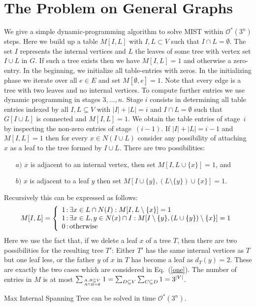 \documentclass{llncs}
\newcommand{\longversion}[1]{#1}
\newcommand{\mc}{\mathcal}
\newcommand{\Oh}{{\mc{O}}}
\begin{document}
\section{The Problem on General Graphs}
We give a simple dynamic-programming algorithm to solve MIST within $\Oh^*(3^n)$ steps. Here we build up a table $M[I,L]$ with $I,L \subset V$ such that $I \cap L= \emptyset$. The set $I$ represents the internal vertices and $L$ the leaves of some tree with vertex set $I \cup L$ in $G$. If such a tree exists then we have $M[I,L]=1$ and otherwise a zero-entry. \longversion{In the beginning, we initialize
all table-entries with zeros.} 
In the initializing phase we iterate over all $e \in E$ and set $M[\emptyset,e]=1$. 
Note that every edge is a tree with two leaves and no internal vertices. 
To compute further entries we use  dynamic programming in stages $3,\ldots,n$. 
Stage $i$ consists in determining all table entries indexed by all $I,L \subseteq V$ with $|I|+|L|=i$ and $I \cap L = \emptyset$ such that $G[I \cup L]$ is connected and $M[I,L]=1$. We obtain the table entries of stage~$i$ by inspecting the non-zero entries of stage~$(i-1)$. 
\longversion{If $|I|+|L|=i-1$ and $M[I,L]=1$ then for every $x \in N(I \cup L)$ consider any possibility of attaching $x$ as a leaf to the tree formed by $I \cup L$. There are two possibilities:
\begin{enumerate}
 \item[$a)$] $x$ is adjacent to an internal vertex, then set $M[I,L \cup \{x\}]=1$, and
 \item[$b)$] $x$ is adjacent to a leaf $y$ then set $M[I \cup \{y\},(L \setminus \{y\}) \cup \{x\}]=1$.
\end{enumerate}
}Recursively this can be expressed as follows:
\begin{equation}\label{one}
M[I,L]=\left\{
\begin{array}{l@{\,:\,}l}
1 & \exists x \in L \cap N(I): M[I,L \setminus  \{x\}]=1\\
1 & \exists x \in L, y \in N(x) \cap I: M[ I \setminus \{y\},(L \cup \{y\}) \setminus \{x\}]=1 \\
0 & \text{otherwise}
\end{array}
 \right.
\end{equation}
Here we use the fact that, if we delete a leaf $x$ of a tree $T$, then there are two possibilities for the resulting tree $T'$: Either $T'$ has the same internal vertices as $T$ but one leaf less, or the father $y$ of $x$ in $T$ has become a leaf as $d_T(y)=2$. These are \longversion{exactly }the two cases which are considered in Eq.~(\ref{one}). The number of entries in $M$ is at most $\longversion{\sum_{A,B \subseteq V \atop A \cap B = \emptyset} 1 = \sum_{D \subseteq V} \sum_{C \subseteq D}1=}3^{|V|}$.
\begin{lemma}
{\sc Max Internal Spanning Tree} can be solved in time $\Oh^*(3^n)$.
\end{lemma}
\end{document}
